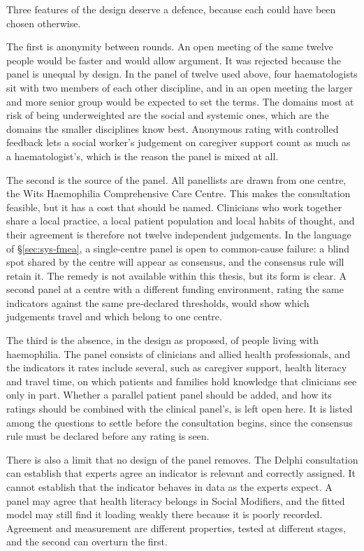 Three features of the design deserve a defence, because each could have been chosen otherwise.

The first is anonymity between rounds. An open meeting of the same twelve people would be faster and would allow argument. It was rejected because the panel is unequal by design. In the panel of twelve used above, four haematologists sit with two members of each other discipline, and in an open meeting the larger and more senior group would be expected to set the terms. The domains most at risk of being underweighted are the social and systemic ones, which are the domains the smaller disciplines know best. Anonymous rating with controlled feedback lets a social worker's judgement on caregiver support count as much as a haematologist's, which is the reason the panel is mixed at all.

The second is the source of the panel. All panellists are drawn from one centre, the Wits Haemophilia Comprehensive Care Centre. This makes the consultation feasible, but it has a cost that should be named. Clinicians who work together share a local practice, a local patient population and local habits of thought, and their agreement is therefore not twelve independent judgements. In the language of \S\ref{sec:sys-fmea}, a single-centre panel is open to common-cause failure: a blind spot shared by the centre will appear as consensus, and the consensus rule will retain it. The remedy is not available within this thesis, but its form is clear. A second panel at a centre with a different funding environment, rating the same indicators against the same pre-declared thresholds, would show which judgements travel and which belong to one centre.

The third is the absence, in the design as proposed, of people living with haemophilia. The panel consists of clinicians and allied health professionals, and the indicators it rates include several, such as caregiver support, health literacy and travel time, on which patients and families hold knowledge that clinicians see only in part. Whether a parallel patient panel should be added, and how its ratings should be combined with the clinical panel's, is left open here. It is listed among the questions to settle before the consultation begins, since the consensus rule must be declared before any rating is seen.

There is also a limit that no design of the panel removes. The Delphi consultation can establish that experts agree an indicator is relevant and correctly assigned. It cannot establish that the indicator behaves in data as the experts expect. A panel may agree that health literacy belongs in Social Modifiers, and the fitted model may still find it loading weakly there because it is poorly recorded. Agreement and measurement are different properties, tested at different stages, and the second can overturn the first.

